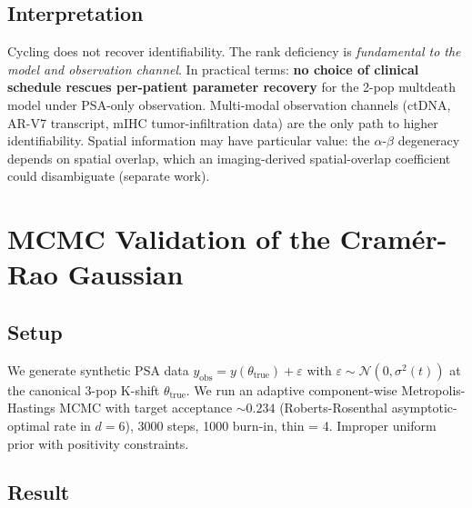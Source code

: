 \documentclass[11pt]{article}
\begin{document}
\subsection{Interpretation}

Cycling does not recover identifiability. The rank deficiency is
\emph{fundamental to the model and observation channel}. In practical terms:
\textbf{no choice of clinical schedule rescues per-patient parameter recovery}
for the 2-pop multdeath model under PSA-only observation. Multi-modal observation
channels (ctDNA, AR-V7 transcript, mIHC tumor-infiltration data) are the only
path to higher identifiability. Spatial information may have particular value:
the $\alpha$-$\beta$ degeneracy depends on spatial overlap, which an
imaging-derived spatial-overlap coefficient could disambiguate (separate work).

\section{MCMC Validation of the Cram\'er-Rao Gaussian}\label{sec:mcmc}

\subsection{Setup}

We generate synthetic PSA data $y_\text{obs} = y(\theta_\text{true}) + \varepsilon$
with $\varepsilon \sim \mathcal{N}(0, \sigma^2(t))$ at the canonical 3-pop K-shift
$\theta_\text{true}$. We run an adaptive component-wise Metropolis-Hastings MCMC
with target acceptance $\sim 0.234$ (Roberts-Rosenthal asymptotic-optimal rate
in $d=6$), 3000 steps, 1000 burn-in, thin = 4. Improper uniform prior with
positivity constraints.

\subsection{Result}\label{sec:mcmc_result}
\end{document}
